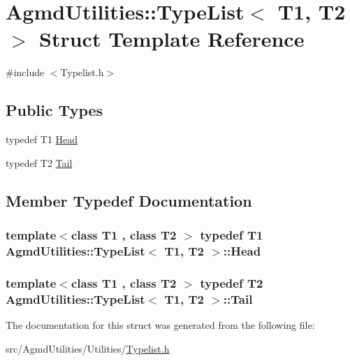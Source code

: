 \hypertarget{struct_agmd_utilities_1_1_type_list}{\section{Agmd\+Utilities\+:\+:Type\+List$<$ T1, T2 $>$ Struct Template Reference}
\label{struct_agmd_utilities_1_1_type_list}
}


{\ttfamily \#include $<$Typelist.\+h$>$}

\subsection*{Public Types}
\begin{DoxyCompactItemize}
\item 
typedef T1 \hyperlink{struct_agmd_utilities_1_1_type_list_a2acfadf46ba1de7f6f5e94aa6c182a5a}{Head}
\item 
typedef T2 \hyperlink{struct_agmd_utilities_1_1_type_list_aaf89bc45db6f1e3ad4de387eb2f84a9f}{Tail}
\end{DoxyCompactItemize}


\subsection{Member Typedef Documentation}
\hypertarget{struct_agmd_utilities_1_1_type_list_a2acfadf46ba1de7f6f5e94aa6c182a5a}{
\subsubsection[{Head}]{\setlength{\rightskip}{0pt plus 5cm}template$<$class T1 , class T2 $>$ typedef T1 {\bf Agmd\+Utilities\+::\+Type\+List}$<$ T1, T2 $>$\+::{\bf Head}}}\label{struct_agmd_utilities_1_1_type_list_a2acfadf46ba1de7f6f5e94aa6c182a5a}
\hypertarget{struct_agmd_utilities_1_1_type_list_aaf89bc45db6f1e3ad4de387eb2f84a9f}{
\subsubsection[{Tail}]{\setlength{\rightskip}{0pt plus 5cm}template$<$class T1 , class T2 $>$ typedef T2 {\bf Agmd\+Utilities\+::\+Type\+List}$<$ T1, T2 $>$\+::{\bf Tail}}}\label{struct_agmd_utilities_1_1_type_list_aaf89bc45db6f1e3ad4de387eb2f84a9f}


The documentation for this struct was generated from the following file\+:\begin{DoxyCompactItemize}
\item 
src/\+Agmd\+Utilities/\+Utilities/\hyperlink{_typelist_8h}{Typelist.\+h}\end{DoxyCompactItemize}
